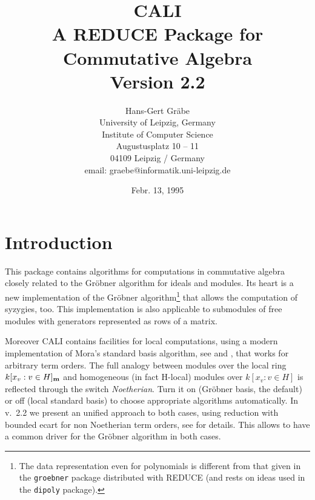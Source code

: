 \documentclass[a4paper,11pt]{article}
\date{Febr. 13, 1995}
\title{CALI\\[20pt] A REDUCE Package for \\ Commutative Algebra \\Version 2.2}
\author{
Hans-Gert Gr\"abe \\[15pt]
University of Leipzig, Germany\\ 
Institute of Computer Science \\
Augustusplatz 10 -- 11\\
04109 Leipzig / Germany\\[20pt]
email: graebe@informatik.uni-leipzig.de}
\newcommand{\gr}{Gr\"obner}
\newcommand{\ind}[1]{{\em #1}\index{#1}}
\begin{document}

\tableofcontents

\pagebreak

\section{Introduction}

This package contains algorithms for computations in commutative
algebra closely related to the {\gr} algorithm for ideals and modules.
Its heart is a new implementation of the {\gr} algorithm\footnote{The
data representation even for polynomials is different from that given
in the {\tt groebner} package distributed with REDUCE (and rests on ideas
used in the {\tt dipoly} package).} that allows the computation of
syzygies, too. This implementation is also applicable to submodules of
free modules with generators represented as rows of a matrix.

Moreover CALI contains facilities for local computations, using a
modern implementation of Mora's standard basis algorithm, see
\cite{MPT} and \cite{tcah}, that works for arbitrary term orders.
The full analogy between modules over the local ring \linebreak[1]
$k[x_v:v\in H]_{\bf m}$ and homogeneous (in fact H-local) modules
over $k[x_v:v\in H]$ is reflected through the switch
\ind{Noetherian}.  Turn it on ({\gr} basis, the default) or off (local
standard basis) to choose appropriate algorithms
automatically. In v.\ 2.2 we present an unified approach to both
cases, using reduction with bounded ecart for non Noetherian term
orders, see \cite{ala} for details. This allows to have a common
driver for the {\gr} algorithm in both cases.
\end{document}
